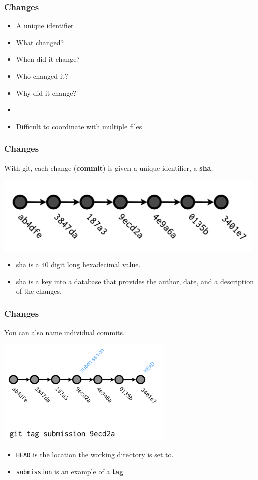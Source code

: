   \begin{frame}[t]
    \frametitle{Changes}
    \begin{itemize}
      \item A unique identifier
      \item What changed?
      \item When did it change?
      \item Who changed it?
      \item Why did it change?
      \item[]
      \item Difficult to coordinate with multiple files
    \end{itemize}
  \end{frame}

  \begin{frame}[t]
    \frametitle{Changes}
    With git, each change ({\bf commit}) is given a unique identifier, a {\bf
    sha}.
    \begin{center}
      \includegraphics[width=0.98\textwidth]{./images/from-wickham-02} 
    \end{center} 

    \begin{itemize} 
      \item sha is a 40 digit long hexadecimal value.
      \item sha is a key into a database that provides the author, date, and a
        description of the changes.
    \end{itemize} 
  \end{frame}

  \begin{frame}[t]
    \frametitle{Changes}
    You can also name individual commits.
    \begin{center}
      \includegraphics[height=2.00in]{./images/from-wickham-03} 
    \end{center} 

    \begin{itemize} 
      \item {\tt HEAD} is the location the working directory is set to.
      \item {\tt submission} is an example of a {\bf tag}
    \end{itemize} 
  \end{frame}

